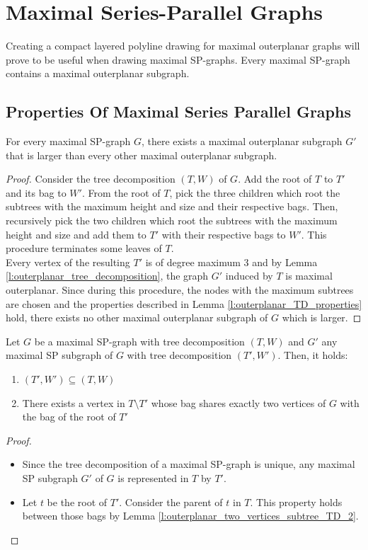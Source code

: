 \section{Maximal Series-Parallel Graphs}\label{section:SP-graphs}

Creating a compact layered polyline drawing for maximal outerplanar graphs will prove to be useful when drawing maximal SP-graphs. Every maximal SP-graph contains a maximal outerplanar subgraph. 

\subsection{Properties Of Maximal Series Parallel Graphs}


\begin{lemma}
	For every maximal SP-graph $G$, there exists a maximal outerplanar subgraph $G'$ that is larger than every other maximal outerplanar subgraph.
\end{lemma}
\begin{proof}
	Consider the tree decomposition $(T,W)$ of $G$. Add the root of $T$ to $T'$ and its bag to $W'$. From the root of $T$, pick the three children which root the subtrees with the maximum height and size and their respective bags. Then, recursively pick the two children which root the subtrees with the maximum height and size and add them to $T'$ with their respective bags to $W'$. This procedure terminates some leaves of $T$.\\
	Every vertex of the resulting $T'$ is of degree maximum 3 and by Lemma \ref{l:outerplanar_tree_decomposition}, the graph $G'$ induced by $T$ is maximal outerplanar. Since during this procedure, the nodes with the maximum subtrees are chosen and the properties described in Lemma \ref{l:outerplanar_TD_properties} hold, there exists no other maximal outerplanar subgraph of $G$ which is larger. 
\end{proof}

\begin{lemma}
	Let $G$ be a maximal SP-graph with tree decomposition $(T,W)$ and $G'$ any maximal SP subgraph of $G$ with tree decomposition $(T',W')$. Then, it holds:
	\begin{enumerate}
		\item $(T',W') \subseteq (T,W)$
		\item There exists a vertex in $T\setminus T'$ whose bag shares exactly two vertices of $G$ with the bag of the root of $T'$
	\end{enumerate}
\end{lemma}
\begin{proof}
	\begin{itemize}
		\item Since the tree decomposition of a maximal SP-graph is unique, any maximal SP subgraph $G'$ of $G$ is represented in $T$ by $T'$.
		\item Let $t$ be the root of $T'$. Consider the parent of $t$ in $T$. This property holds between those bags by Lemma \ref{l:outerplanar_two_vertices_subtree_TD_2}.
	\end{itemize}
\end{proof}

